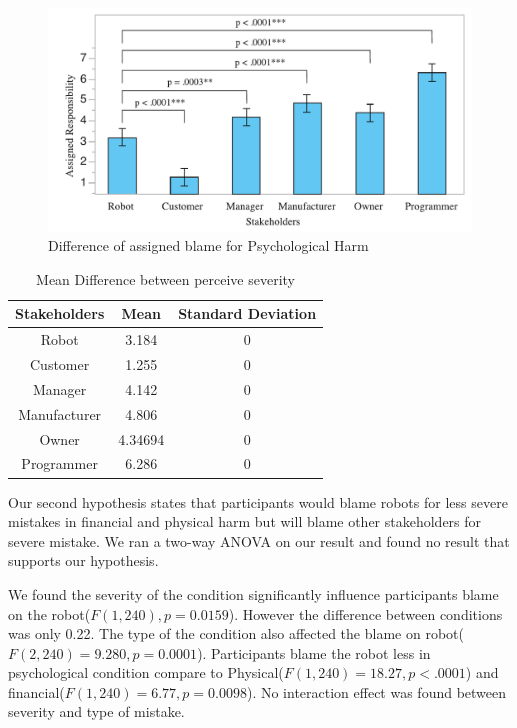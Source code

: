 \documentclass{sigchi}
\begin{document}
\begin{figure}[!h]
\centering
\includegraphics[width=0.8\columnwidth]{psychologicalGraph}
\caption{Difference of assigned blame for Psychological Harm}
\label{fig:figure5}
\end{figure}

\begin{table}[h]
  \centering
  \begin{tabular}{|c|c|c|}
    \hline
    Stakeholders & Mean & Standard Deviation\\
    \hline
    Robot & 3.184 & 0\\
    \hline
    Customer & 1.255 & 0\\
    \hline
    Manager & 4.142 & 0 \\
    \hline
    Manufacturer & 4.806 & 0 \\
    \hline
    Owner & 4.34694 & 0 \\
    \hline
    Programmer & 6.286 & 0 \\
    \hline
  \end{tabular}
  \caption{Mean Difference between perceive severity}
  \label{tab:table2}
\end{table}

Our second hypothesis states that participants would blame robots for less severe mistakes in financial and physical harm but will blame other stakeholders for severe mistake. We ran a two-way ANOVA on our result and found no result that supports our hypothesis.


We found the severity of the condition significantly influence participants blame on the robot($F(1,240), p = 0.0159$). However the difference between conditions was only 0.22. The type of the condition also affected the blame on robot($F(2,240)=9.280, p = 0.0001$). Participants blame the robot less in psychological condition compare to Physical($F(1,240)=18.27, p < .0001$) and financial($F(1,240)=6.77, p = 0.0098$). No interaction effect was found between severity and type of mistake.
\end{document}
